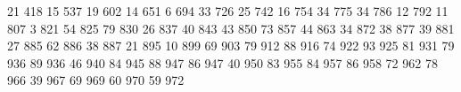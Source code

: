 21 418
15 537
19 602
14 651
6 694
33 726
25 742
16 754
34 775
34 786
12 792
11 807
3 821
54 825
79 830
26 837
40 843
43 850
73 857
44 863
34 872
38 877
39 881
27 885
62 886
38 887
21 895
10 899
69 903
79 912
88 916
74 922
93 925
81 931
79 936
89 936
46 940
84 945
88 947
86 947
40 950
83 955
84 957
86 958
72 962
78 966
39 967
69 969
60 970
59 972
